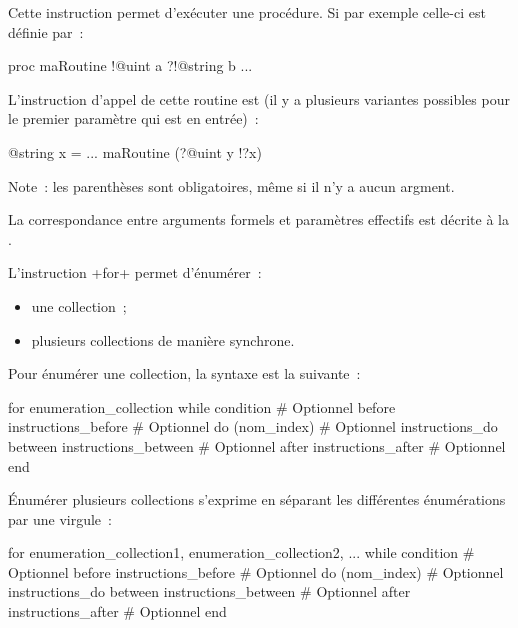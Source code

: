 

Cette instruction permet d'exécuter une procédure. Si par exemple celle-ci est définie par~:
\begin{galgas}
proc maRoutine !@uint a ?!@string b {
  ...
}
\end{galgas}

L'instruction d'appel de cette routine est (il y a plusieurs variantes possibles pour le premier paramètre qui est en entrée)~:
\begin{galgas}
@string x = ...
maRoutine (?@uint y !?x)
\end{galgas}

Note~: les parenthèses sont obligatoires, même si il n'y a aucun argment.

La correspondance entre arguments formels et paramètres effectifs est décrite à la .





L'instruction \ggs+for+ permet d'énumérer~:
\begin{itemize}
  \item une collection~;
  \item plusieurs collections de manière synchrone.
\end{itemize}

Pour énumérer une collection, la syntaxe est la suivante~:

\begin{galgasbox}
for enumeration_collection
while condition # Optionnel
before instructions_before  # Optionnel
do 
  (nom_index) # Optionnel
  instructions_do
between instructions_between  # Optionnel
after instructions_after  # Optionnel
end
\end{galgasbox}


Énumérer plusieurs collections s'exprime en séparant les différentes énumérations par une virgule~:
\begin{galgasbox}
for enumeration_collection1, enumeration_collection2, ...
while condition # Optionnel
before instructions_before  # Optionnel
do
  (nom_index) # Optionnel
  instructions_do
between instructions_between  # Optionnel
after instructions_after  # Optionnel
end
\end{galgasbox}


